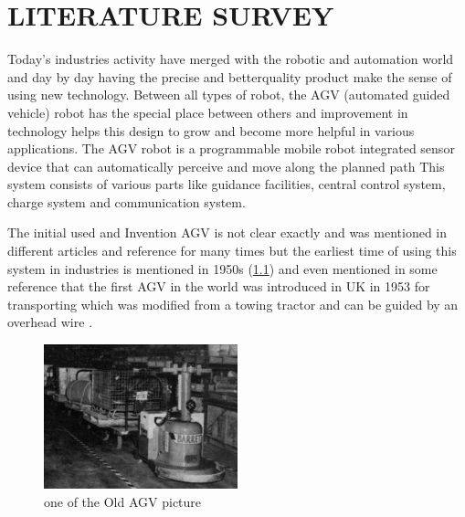 \documentclass[main]{subfiles}
\begin{document}
\chapter{\hfil LITERATURE SURVEY \hfil}
\justifying
Today’s industries activity have merged
with the robotic and automation world and
day by day having the precise and betterquality
product make the sense of using
new technology. Between all types of
robot, the AGV (automated guided
vehicle) robot has the special place
between others and improvement in
technology helps this design to grow and
become more helpful in various
applications. The AGV robot is a
programmable mobile robot integrated
sensor device that can automatically
perceive and move along the planned
path\cite{das2016design} This system consists of various
parts like guidance facilities, central
control system, charge system and
communication system\cite{moshayedi2019agv}. 

The initial used and Invention AGV is not clear exactly and
was mentioned in different articles and
reference for many times but the earliest
time of using this system in industries is
mentioned in 1950s \cite{reveliotis2000conflict}
(\cref{oldAgv}) and even
mentioned in some reference that the first
AGV in the world was introduced in UK in
1953 for transporting which was modified
from a towing tractor and can be guided by
an overhead wire \cite{moshayedi2019agv}.

\begin{figure}[H]
    \centering
\includegraphics[width=0.5\textwidth]{doc/oldestAGV.jpg}
\caption{one of the Old AGV picture}
\label{oldAgv} %
\end{figure}
\end{document}
